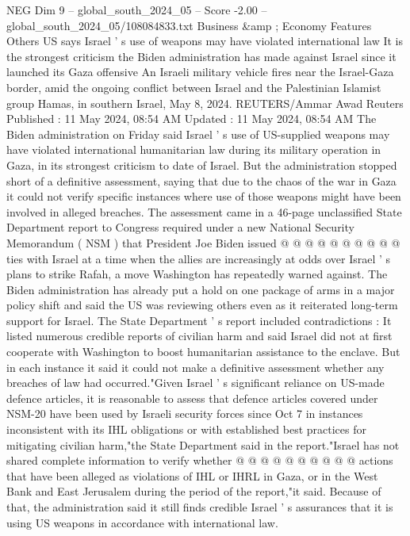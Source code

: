 \begin{textsample}{NEG Dim 9 – global\_south\_2024\_05 – Score -2.00 – global\_south\_2024\_05/108084833.txt}  \label{ex:f9_neg_327}
Business \&amp ; Economy Features Others US says Israel ' s use of weapons may have violated international law It is the strongest criticism the Biden administration has made against Israel since it launched its Gaza offensive An Israeli military vehicle fires near the Israel-Gaza border, amid the ongoing conflict between Israel and the Palestinian Islamist group Hamas, in southern Israel, May 8, 2024.
REUTERS/Ammar Awad Reuters Published : 11 May 2024, 08:54 AM Updated : 11 May 2024, 08:54 AM The Biden administration on Friday said Israel ' s use of US-supplied weapons may have violated international humanitarian law during its military operation in Gaza, in its strongest criticism to date of Israel.
But the administration stopped short of a definitive assessment, saying that due to the chaos of the war in Gaza it could not verify specific instances where use of those weapons might have been involved in alleged breaches.
The assessment came in a 46-page unclassified State Department report to Congress required under a new National Security Memorandum ( NSM ) that President Joe Biden issued @ @ @ @ @ @ @ @ @ @ ties with Israel at a time when the allies are increasingly at odds over Israel ' s plans to strike Rafah, a move Washington has repeatedly warned against.
The Biden administration has already put a hold on one package of arms in a major policy shift and said the US was reviewing others even as it reiterated long-term support for Israel.
The State Department ' s report included contradictions : It listed numerous credible reports of civilian harm and said Israel did not at first cooperate with Washington to boost humanitarian assistance to the enclave.
But in each instance it said it could not make a definitive assessment whether any breaches of law had occurred."Given Israel ' s significant reliance on US-made defence articles, it is reasonable to assess that defence articles covered under NSM-20 have been used by Israeli security forces since Oct 7 in instances inconsistent with its IHL obligations or with established best practices for mitigating civilian harm,"the State Department said in the report."Israel has not shared complete information to verify whether @ @ @ @ @ @ @ @ @ @ actions that have been alleged as violations of IHL or IHRL in Gaza, or in the West Bank and East Jerusalem during the period of the report,"it said.
Because of that, the administration said it still finds credible Israel ' s assurances that it is using US weapons in accordance with international law.

\end{textsample}
